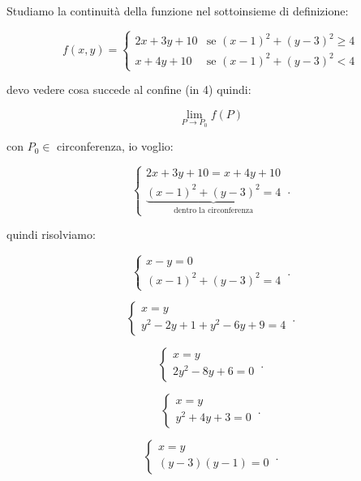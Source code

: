 \documentclass[11pt]{article}
\begin{document}
Studiamo la continuità della funzione nel sottoinsieme di definizione:

\[
f(x,y)=
    \begin{cases}
        2x+3y+10 & \text{se $(x-1)^{2}+(y-3)^{2}\ge 4$} \\
        x+4y+10 & \text{se $(x-1)^{2}+(y-3)^{2}<4$}
    \end{cases}
\]

devo vedere cosa succede al confine (in 4) quindi:

\[
    \lim_{ P \to P_0 } f(P)
\]

con $P_0 \in $ circonferenza, io voglio:

\begin{equation}
    \begin{cases}
    2x+3y+10 = x +4y +10\\
    \underbrace{(x-1)^{2} + (y-3)^{2}=4}_\text{dentro la circonferenza}    \end{cases}\,.
\end{equation}

quindi risolviamo:

\begin{equation}
    \begin{cases}
           x-y=0\\
           (x-1)^{2}+(y-3)^{2} = 4
    \end{cases}\,.
\end{equation}

\begin{equation}
    \begin{cases}
           x=y\\
           y^{2}-2y+1+y^{2}-6y+9=4
    \end{cases}\,.
\end{equation}

\begin{equation}
    \begin{cases}
           x=y\\
           2y^{2}-8y + 6 = 0
    \end{cases}\,.
\end{equation}

\begin{equation}
    \begin{cases}
           x=y\\
           y^{2}+4y+3=0
    \end{cases}\,.
\end{equation}

\begin{equation}
    \begin{cases}
           x=y\\
           (y-3)(y-1) = 0
    \end{cases}\,.
\end{equation}
\end{document}
